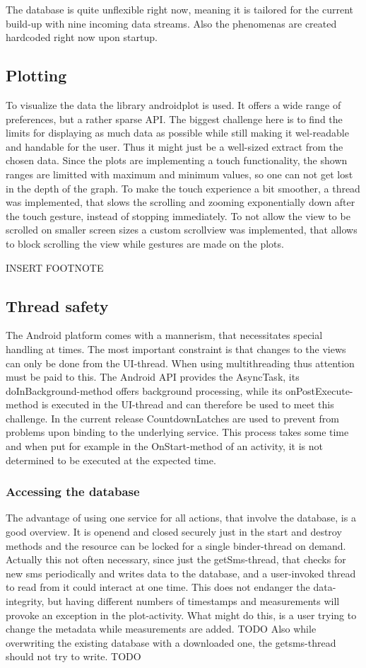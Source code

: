 \documentclass[11pt,oneside,a4paper]{scrartcl}
\begin{document}
The database is quite unflexible right now, meaning it is tailored for the current build-up with nine incoming data streams. Also the phenomenas are created hardcoded right now upon startup.


\subsection{Plotting}
To visualize the data the library androidplot is used. It offers a wide range of preferences, but a rather sparse API. The biggest challenge here is to find the limits for displaying as much data as possible while still making it wel-readable and handable for the user. Thus it might just be a well-sized extract from the chosen data.
Since the plots are implementing a touch functionality, the shown ranges are limitted with maximum and minimum values, so one can not get lost in the depth of the graph. 
To make the touch experience a bit smoother, a thread was implemented, that slows the scrolling and zooming exponentially down after the touch gesture, instead of stopping immediately.
To not allow the view to be scrolled on smaller screen sizes a custom scrollview was implemented, that allows to block scrolling the view while gestures are made on the plots.

INSERT FOOTNOTE

\subsection{Thread safety}
The Android platform comes with a mannerism, that necessitates special handling at times. The most important constraint is that changes to the views can only be done from the UI-thread. When using multithreading thus attention must be paid to this. The Android API provides the AsyncTask, its doInBackground-method offers background processing, while its onPostExecute-method is executed in the UI-thread and can therefore be used to meet this challenge.
In the current release CountdownLatches are used to prevent from problems upon binding to the underlying service. This process takes some time and when put for example in the OnStart-method of an activity, it is not determined to be executed at the expected time.

\subsubsection{Accessing the database}\label{sec:database_safety}
The advantage of using one service for all actions, that involve the database, is a good overview. It is openend and closed securely just in the start and destroy methods and the resource can be locked for a single binder-thread on demand. Actually this not often necessary, since just the getSms-thread, that checks for new sms periodically and writes data to the database, and a user-invoked thread to read from it could interact at one time. This does not endanger the data-integrity, but having different numbers of timestamps and measurements will provoke an exception in the plot-activity.
What might do this, is a user trying to change the metadata while measurements are added. TODO
Also while overwriting the existing database with a downloaded one, the getsms-thread should not try to write. TODO
\end{document}
